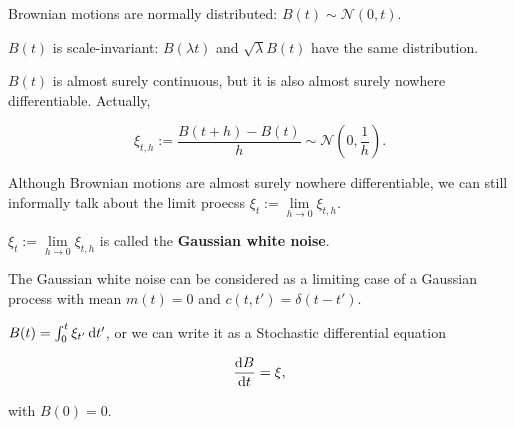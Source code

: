 \begin{proposition}
    Brownian motions are normally distributed: $B(t) \sim \mathcal{N}(0, t)$.
\end{proposition}

\begin{proposition}
    $B(t)$ is scale-invariant: $B(\lambda t)$ and $\sqrt{\lambda} B(t)$ have the same distribution. 
\end{proposition}

\begin{proposition}
    $B(t)$ is almost surely continuous, but it is also almost surely nowhere differentiable. Actually, 

    \begin{equation*}
        \xi_{t, h} := \frac{B(t+h) - B(t)}{h} \sim \mathcal{N}\left(0, \frac{1}{h}\right).
    \end{equation*}
\end{proposition}

Although Brownian motions are almost surely nowhere differentiable, we can still informally talk about the limit proecss $\xi_t := \lim\limits_{h \to 0} \xi_{t, h}$. 

\begin{definition}
    $\xi_t := \lim\limits_{h \to 0} \xi_{t, h}$ is called the \textbf{Gaussian white noise}.
\end{definition}

\begin{remark}
    The Gaussian white noise can be considered as a limiting case of a Gaussian process with mean $m(t) = 0$ and $c(t, t') = \delta(t - t')$.
\end{remark}

\begin{proposition}
    $B(t) = \int_0^t \xi_{t'} \dif t'$, or we can write it as a Stochastic differential equation 

    \begin{equation*}
        \frac{\dif B}{\dif t} = \xi, 
    \end{equation*}

    with $B(0) = 0$.
\end{proposition}